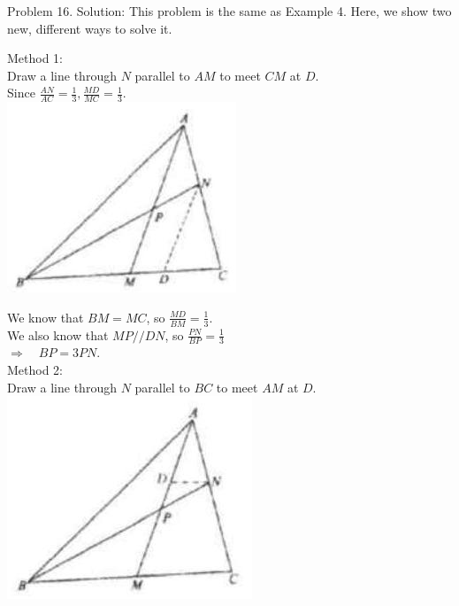 \documentclass[10pt]{article}
\begin{document}
Problem 16. Solution:
This problem is the same as Example 4. Here, we show two new, different ways to solve it.


Method 1:\\
Draw a line through \(N\) parallel to \(A M\) to meet \(C M\) at \(D\).\\
Since \(\frac{A N}{A C}=\frac{1}{3}, \frac{M D}{M C}=\frac{1}{3}\).\\
\includegraphics[max width=\textwidth, center]{2025_04_17_97bc1f7e44d93c271a88g-139}

We know that \(B M=M C\), so \(\frac{M D}{B M}=\frac{1}{3}\).\\
We also know that \(M P / / D N\), so \(\frac{P N}{B P}=\frac{1}{3}\)\\
\(\Rightarrow \quad B P=3 P N\).\\
Method 2:\\
Draw a line through \(N\) parallel to \(B C\) to meet \(A M\) at \(D\).\\
\includegraphics[max width=\textwidth, center]{2025_04_17_97bc1f7e44d93c271a88g-139(2)}
\end{document}
